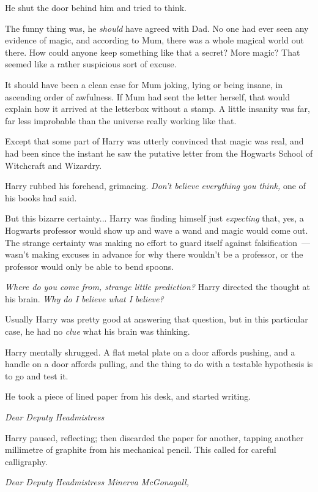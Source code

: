 He shut the door behind him and tried to think.

The funny thing was, he \emph{should} have agreed with Dad. No one had ever seen any evidence of magic, and according to Mum, there was a whole magical world out there. How could anyone keep something like that a secret? More magic? That seemed like a rather suspicious sort of excuse.

It should have been a clean case for Mum joking, lying or being insane, in ascending order of awfulness. If Mum had sent the letter herself, that would explain how it arrived at the letterbox without a stamp. A little insanity was far, far less improbable than the universe really working like that.

Except that some part of Harry was utterly convinced that magic was real, and had been since the instant he saw the putative letter from the Hogwarts School of Witchcraft and Wizardry.

Harry rubbed his forehead, grimacing. \emph{Don't believe everything you think,} one of his books had said.

But this bizarre certainty... Harry was finding himself just \emph{expecting} that, yes, a Hogwarts professor would show up and wave a wand and magic would come out. The strange certainty was making no effort to guard itself against falsification~--- wasn't making excuses in advance for why there wouldn't be a professor, or the professor would only be able to bend spoons.

\emph{Where do you come from, strange little prediction?} Harry directed the thought at his brain. \emph{Why do I believe what I believe?}

Usually Harry was pretty good at answering that question, but in this particular case, he had no \emph{clue} what his brain was thinking.

Harry mentally shrugged. A flat metal plate on a door affords pushing, and a handle on a door affords pulling, and the thing to do with a testable hypothesis is to go and test it.

He took a piece of lined paper from his desk, and started writing.

\emph{Dear Deputy Headmistress}

Harry paused, reflecting; then discarded the paper for another, tapping another millimetre of graphite from his mechanical pencil. This called for careful calligraphy.

\emph{Dear Deputy Headmistress Minerva McGonagall,}

